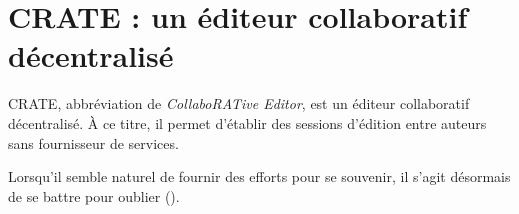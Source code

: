 

\chapter{CRATE : un éditeur collaboratif décentralisé}
\minitoc

\lettrine{C}RATE, abbréviation de \emph{CollaboRATive Editor}, est un éditeur
collaboratif décentralisé. À ce titre, il permet d'établir des sessions
d'édition entre auteurs sans fournisseur de services. 

Lorsqu'il semble naturel de fournir des efforts pour se souvenir, il s'agit
désormais de se battre pour oublier (\REF).

